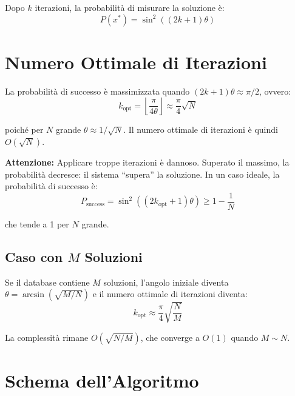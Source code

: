 \begin{onehalfspace}
Dopo $k$ iterazioni, la probabilità di misurare la soluzione è:
\begin{equation}
    P(x^*) = \sin^2\!\left((2k+1)\theta\right)
\end{equation}

\section{Numero Ottimale di Iterazioni}

La probabilità di successo è massimizzata quando $(2k+1)\theta \approx \pi/2$, ovvero:
\begin{equation}
    k_{\text{opt}} = \left\lfloor \frac{\pi}{4\theta} \right\rfloor \approx \frac{\pi}{4}\sqrt{N}
\end{equation}

poiché per $N$ grande $\theta \approx 1/\sqrt{N}$. Il numero ottimale di iterazioni è quindi $O(\sqrt{N})$.

\textbf{Attenzione:} Applicare troppe iterazioni è dannoso. Superato il massimo, la probabilità decresce: il sistema ``supera'' la soluzione. In un caso ideale, la probabilità di successo è:
\begin{equation}
    P_{\text{success}} = \sin^2\!\left(\left(2k_{\text{opt}}+1\right)\theta\right) \geq 1 - \frac{1}{N}
\end{equation}

che tende a 1 per $N$ grande.

\subsection{Caso con $M$ Soluzioni}

Se il database contiene $M$ soluzioni, l'angolo iniziale diventa $\theta = \arcsin(\sqrt{M/N})$ e il numero ottimale di iterazioni diventa:
\begin{equation}
    k_{\text{opt}} \approx \frac{\pi}{4}\sqrt{\frac{N}{M}}
\end{equation}

La complessità rimane $O(\sqrt{N/M})$, che converge a $O(1)$ quando $M \sim N$.

\section{Schema dell'Algoritmo}


\end{onehalfspace}
